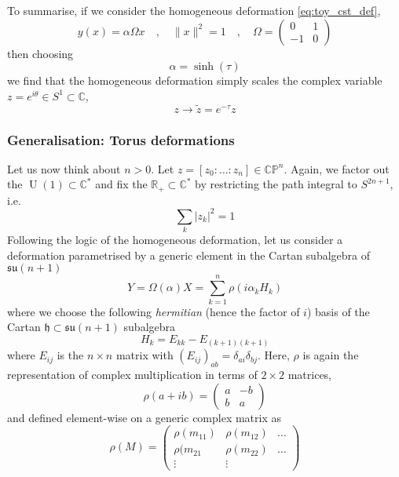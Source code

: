 \documentclass[a4paper,11pt]{article}
\theoremstyle{definition}
\newcommand{\RR}{\mathbb{R}}
\newcommand{\CC}{\mathbb{C}}
\newcommand{\CP}{\mathbb{CP}}
\DeclareMathOperator{\U}{U}
\newcommand{\h}{\mathfrak{h}}
\newcommand{\su}{\mathfrak{su}}
\newcommand{\mat}[4]{\begin{pmatrix} #1 & #2 \\ #3 & #4 \end{pmatrix}}
\begin{document}
To summarise, if we consider the homogeneous deformation \eqref{eq:toy_cst_def},
\begin{equation}
  y(x) = \alpha \Omega x \quad , \quad \lVert x \rVert^2 = 1 \quad , \quad \Omega = \mat{0}{1}{-1}{0}
\end{equation}
then choosing 
\begin{equation}
  \boxed{
    \alpha = \sinh(\tau)
  }
\end{equation}
we find that the homogeneous deformation simply scales the complex variable $z = e^{i\theta} \in S^1 \subset \CC$,
\begin{equation}
  z \to \tilde z = e^{-\tau} z
\end{equation}

\subsubsection{Generalisation: Torus deformations}
Let us now think about $n > 0$. 
Let $z = [z_0:\dots:z_n] \in \CP^n$. 
Again, we factor out the $\U(1) \subset \CC^*$ and fix the $\RR_+ \subset \CC^*$ by restricting the path integral to $S^{2n +1}$, i.e.
\begin{equation}
  \sum_k \lvert z_k \rvert^2 = 1
\end{equation}
Following the logic of the homogeneous deformation, let us consider a deformation parametrised by a generic element in the Cartan subalgebra of $\su(n+1)$
\begin{equation}
  Y = \Omega(\alpha)X = \sum_{k=1}^{n} \rho(i \alpha_k H_k)
\end{equation}
where we choose the following \emph{hermitian} (hence the factor of $i$) basis of the Cartan $\h \subset \su(n+1)$ subalgebra
\begin{equation}
H_k = E_{kk} - E_{(k+1)(k+1)}
\end{equation}
where $E_{ij}$ is the $n \times n$ matrix with $(E_{ij})_{ab} = \delta_{ai}\delta_{bj}$.
Here, $\rho$ is again the representation of complex multiplication in terms of $2\times2$ matrices,
\begin{equation}
  \rho(a + ib) = \mat{a}{-b}{b}{a}
\end{equation}
and defined element-wise on a generic complex matrix as
\begin{equation}
  \rho(M) = 
  \begin{pmatrix} 
    \rho(m_{11}) & \rho(m_{12}) & \dots \\ 
    \rho(m_{21} & \rho(m_{22}) & \dots \\
     \vdots & \vdots & 
   \end{pmatrix}
\end{equation}
\end{document}
